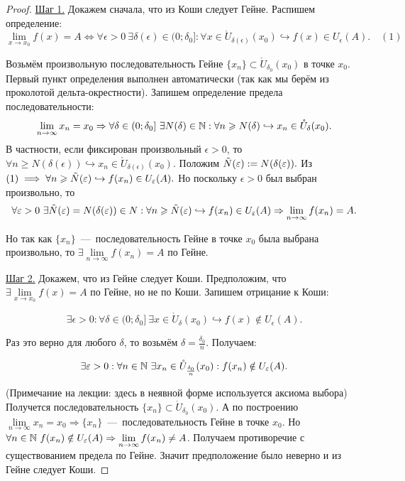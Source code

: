 \begin{proof}
    \underline{Шаг 1.} Докажем сначала, что из Коши следует Гейне. Распишем определение:
    $$ \lim\limits_{x\to x_{0}} f (x) = A \Leftrightarrow \forall \epsilon > 0 \ \exists \delta (\epsilon) \in (0; \delta_{0}]: \forall x \in \mathring{U}_{\delta (\epsilon)} (x_{0}) \hookrightarrow f (x) \in U_{\epsilon} (A). \quad (1)$$

    Возьмём произвольную последовательность Гейне $\{ x_{n} \} \subset \mathring{U}_{\delta_{0}} (x_{0})$ в точке $x_{0}$. Первый пункт определения выполнен автоматически (так как мы берём из проколотой дельта-окрестности). Запишем определение предела последовательности:
    $$ \lim\limits_{n\to \infty} x_{n} = x_{0} \Rightarrow \forall \delta \in (0; \delta_{0}] \ \exists N (\delta) \in \N: \forall n \geq N (\delta) \hookrightarrow x_{n} \in \mathring{U}_{\delta} (x_{0}).$$
    В частности, если фиксирован произвольный $\epsilon > 0$, то $\forall n \geq N (\delta (\epsilon) ) \hookrightarrow x_{n} \in \mathring{U}_{\delta (\epsilon)} (x_{0}).$ Положим $\Tilde{N} (\epsilon) := N (\delta (\epsilon)).$ Из $(1) \implies \forall n \geq \Tilde{N} (\epsilon) \hookrightarrow f (x_{n}) \in U_{\epsilon} (A).$ Но поскольку $\epsilon > 0$ был выбран произвольно, то
    $$ \forall \epsilon > 0 \  \exists \Tilde{N} (\epsilon) = N (\delta (\epsilon)) \in N: \forall n \geq \Tilde{N} (\epsilon) \hookrightarrow f (x_{n}) \in U_{\epsilon} (A) \Rightarrow \lim\limits_{n\to \infty} f(x_{n}) = A.$$

    Но так как $\{ x_{n} \}$~---~последовательность Гейне в точке $x_{0}$ была выбрана произвольно, то  $\exists \lim\limits_{n\to \infty} f (x_{n}) = A$ по Гейне.

    \underline{Шаг 2.} Докажем, что из Гейне следует Коши. Предположим, что $\exists \lim\limits_{x\to x_{0}} f (x) = A$ по Гейне, но не по Коши. Запишем отрицание к Коши:

    $$ \exists \epsilon > 0: \forall \delta \in (0; \delta_{0}] \   \exists x \in \mathring{U}_{\delta} (x_{0}) \hookrightarrow f (x) \notin U_{\epsilon} (A).$$

    Раз это верно для любого $\delta$, то возьмём $\delta = \frac{\delta_{0}}{n}$. Получаем:

    $$ \exists \epsilon > 0: \forall n \in \N \  \exists x_{n} \in \mathring{U}_{\frac{\delta_{0}}{n}} (x_{0}): f (x_{n}) \notin U_{\epsilon} (A).$$

    (Примечание на лекции: здесь в неявной форме используется аксиома выбора) Получется последовательность $\{ x_{n} \} \subset \mathring{U}_{\delta_{0}} (x_{0})$. А по построению $\lim\limits_{n\to \infty} x_{n} = x_{0} \Rightarrow \{ x_{n} \}$~---~последовательность Гейне в точке $x_{0}$. Но $\forall n \in \N \  f (x_{n}) \notin U_{\epsilon} (A) \Rightarrow \lim\limits_{n\to \infty} f (x_{n}) \neq A$. Получаем противоречие с существованием предела по Гейне. Значит предположение было неверно и из Гейне следует Коши.
\end{proof}

